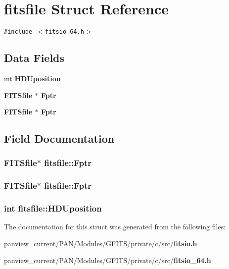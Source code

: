 \section{fitsfile Struct Reference}
\label{structfitsfile}
{\tt \#include $<$fitsio\_\-64.h$>$}

\subsection*{Data Fields}
\begin{CompactItemize}
\item 
int \bf{HDUposition}
\item 
\bf{FITSfile} $\ast$ \bf{Fptr}
\item 
\bf{FITSfile} $\ast$ \bf{Fptr}
\end{CompactItemize}


\subsection{Field Documentation}
\subsubsection{\setlength{\rightskip}{0pt plus 5cm}\bf{FITSfile}$\ast$ \bf{fitsfile::Fptr}}\label{structfitsfile_4ce1e99e95954c8c42ccd93401c9f477}


\subsubsection{\setlength{\rightskip}{0pt plus 5cm}\bf{FITSfile}$\ast$ \bf{fitsfile::Fptr}}\label{structfitsfile_4ce1e99e95954c8c42ccd93401c9f477}


\subsubsection{\setlength{\rightskip}{0pt plus 5cm}int \bf{fitsfile::HDUposition}}\label{structfitsfile_0b1d48e862cf8fb644e293e5899a7b68}




The documentation for this struct was generated from the following files:\begin{CompactItemize}
\item 
panview\_\-current/PAN/Modules/GFITS/private/c/src/\bf{fitsio.h}\item 
panview\_\-current/PAN/Modules/GFITS/private/c/src/\bf{fitsio\_\-64.h}\end{CompactItemize}
